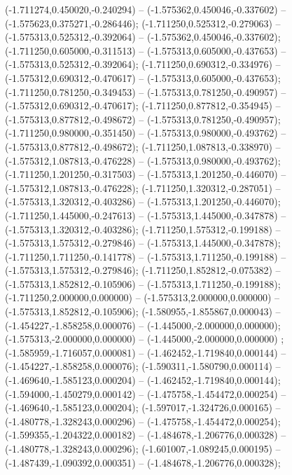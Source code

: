  (-1.711274,0.450020,-0.240294) -- (-1.575362,0.450046,-0.337602) -- (-1.575623,0.375271,-0.286446);
 (-1.711250,0.525312,-0.279063) -- (-1.575313,0.525312,-0.392064) -- (-1.575362,0.450046,-0.337602);
 (-1.711250,0.605000,-0.311513) -- (-1.575313,0.605000,-0.437653) -- (-1.575313,0.525312,-0.392064);
 (-1.711250,0.690312,-0.334976) -- (-1.575312,0.690312,-0.470617) -- (-1.575313,0.605000,-0.437653);
 (-1.711250,0.781250,-0.349453) -- (-1.575313,0.781250,-0.490957) -- (-1.575312,0.690312,-0.470617);
 (-1.711250,0.877812,-0.354945) -- (-1.575313,0.877812,-0.498672) -- (-1.575313,0.781250,-0.490957);
 (-1.711250,0.980000,-0.351450) -- (-1.575313,0.980000,-0.493762) -- (-1.575313,0.877812,-0.498672);
 (-1.711250,1.087813,-0.338970) -- (-1.575312,1.087813,-0.476228) -- (-1.575313,0.980000,-0.493762);
 (-1.711250,1.201250,-0.317503) -- (-1.575313,1.201250,-0.446070) -- (-1.575312,1.087813,-0.476228);
 (-1.711250,1.320312,-0.287051) -- (-1.575313,1.320312,-0.403286) -- (-1.575313,1.201250,-0.446070);
 (-1.711250,1.445000,-0.247613) -- (-1.575313,1.445000,-0.347878) -- (-1.575313,1.320312,-0.403286);
 (-1.711250,1.575312,-0.199188) -- (-1.575313,1.575312,-0.279846) -- (-1.575313,1.445000,-0.347878);
 (-1.711250,1.711250,-0.141778) -- (-1.575313,1.711250,-0.199188) -- (-1.575313,1.575312,-0.279846);
 (-1.711250,1.852812,-0.075382) -- (-1.575313,1.852812,-0.105906) -- (-1.575313,1.711250,-0.199188);
 (-1.711250,2.000000,0.000000) -- (-1.575313,2.000000,0.000000) -- (-1.575313,1.852812,-0.105906);
 (-1.580955,-1.855867,0.000043) -- (-1.454227,-1.858258,0.000076) -- (-1.445000,-2.000000,0.000000);
 (-1.575313,-2.000000,0.000000) -- (-1.445000,-2.000000,0.000000) ;
 (-1.585959,-1.716057,0.000081) -- (-1.462452,-1.719840,0.000144) -- (-1.454227,-1.858258,0.000076);
 (-1.590311,-1.580790,0.000114) -- (-1.469640,-1.585123,0.000204) -- (-1.462452,-1.719840,0.000144);
 (-1.594000,-1.450279,0.000142) -- (-1.475758,-1.454472,0.000254) -- (-1.469640,-1.585123,0.000204);
 (-1.597017,-1.324726,0.000165) -- (-1.480778,-1.328243,0.000296) -- (-1.475758,-1.454472,0.000254);
 (-1.599355,-1.204322,0.000182) -- (-1.484678,-1.206776,0.000328) -- (-1.480778,-1.328243,0.000296);
 (-1.601007,-1.089245,0.000195) -- (-1.487439,-1.090392,0.000351) -- (-1.484678,-1.206776,0.000328);
